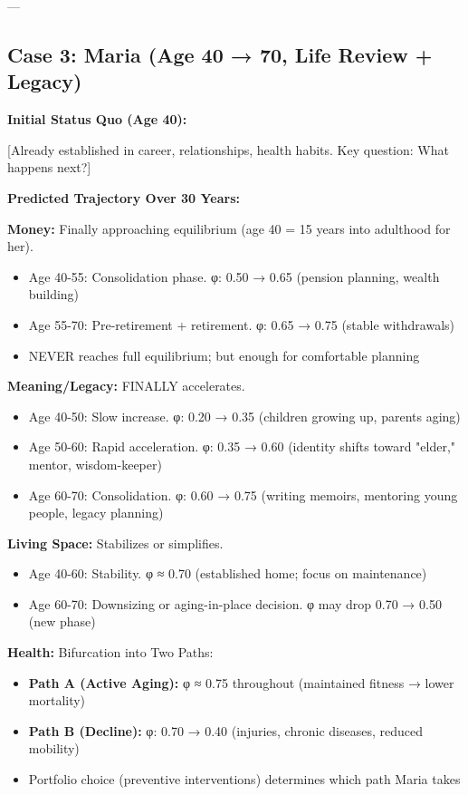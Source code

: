 {{---

\subsection{Case 3: Maria (Age 40 → 70, Life Review + Legacy)}

\textbf{Initial Status Quo (Age 40):}

[Already established in career, relationships, health habits. Key question: What happens next?]

\textbf{Predicted Trajectory Over 30 Years:}

\textbf{Money:} Finally approaching equilibrium (age 40 = 15 years into adulthood for her).
\begin{itemize}[nosep]
\item Age 40-55: Consolidation phase. φ: 0.50 → 0.65 (pension planning, wealth building)
\item Age 55-70: Pre-retirement + retirement. φ: 0.65 → 0.75 (stable withdrawals)
\item NEVER reaches full equilibrium; but enough for comfortable planning
\end{itemize}

\textbf{Meaning/Legacy:} FINALLY accelerates.
\begin{itemize}[nosep]
\item Age 40-50: Slow increase. φ: 0.20 → 0.35 (children growing up, parents aging)
\item Age 50-60: Rapid acceleration. φ: 0.35 → 0.60 (identity shifts toward "elder," mentor, wisdom-keeper)
\item Age 60-70: Consolidation. φ: 0.60 → 0.75 (writing memoirs, mentoring young people, legacy planning)
\end{itemize}

\textbf{Living Space:} Stabilizes or simplifies.
\begin{itemize}[nosep]
\item Age 40-60: Stability. φ ≈ 0.70 (established home; focus on maintenance)
\item Age 60-70: Downsizing or aging-in-place decision. φ may drop 0.70 → 0.50 (new phase)
\end{itemize}

\textbf{Health:} Bifurcation into Two Paths:
\begin{itemize}[nosep]
\item \textbf{Path A (Active Aging):} φ ≈ 0.75 throughout (maintained fitness → lower mortality)
\item \textbf{Path B (Decline):} φ: 0.70 → 0.40 (injuries, chronic diseases, reduced mobility)
\item Portfolio choice (preventive interventions) determines which path Maria takes
\end{itemize}

}}

